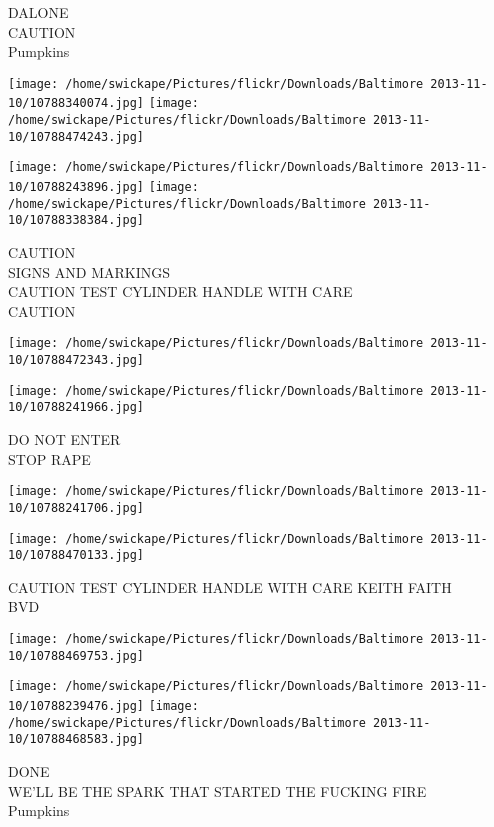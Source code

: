 \documentclass[10pt,letterpaper]{article}
\begin{document}
DALONE\\
CAUTION\\
Pumpkins\\
\pagebreak

\texttt{[image: /home/swickape/Pictures/flickr/Downloads/Baltimore 2013-11-10/10788340074.jpg]}
\texttt{[image: /home/swickape/Pictures/flickr/Downloads/Baltimore 2013-11-10/10788474243.jpg]}

\texttt{[image: /home/swickape/Pictures/flickr/Downloads/Baltimore 2013-11-10/10788243896.jpg]}
\texttt{[image: /home/swickape/Pictures/flickr/Downloads/Baltimore 2013-11-10/10788338384.jpg]}

CAUTION\\
SIGNS AND MARKINGS\\
CAUTION TEST CYLINDER HANDLE WITH CARE\\
CAUTION\\
\pagebreak

\texttt{[image: /home/swickape/Pictures/flickr/Downloads/Baltimore 2013-11-10/10788472343.jpg]}

\vspace{0.25in}
\texttt{[image: /home/swickape/Pictures/flickr/Downloads/Baltimore 2013-11-10/10788241966.jpg]}

DO NOT ENTER\\
STOP RAPE\\
\pagebreak

\texttt{[image: /home/swickape/Pictures/flickr/Downloads/Baltimore 2013-11-10/10788241706.jpg]}

\vspace{0.25in}
\texttt{[image: /home/swickape/Pictures/flickr/Downloads/Baltimore 2013-11-10/10788470133.jpg]}

CAUTION TEST CYLINDER HANDLE WITH CARE KEITH FAITH\\
BVD\\
\pagebreak

\texttt{[image: /home/swickape/Pictures/flickr/Downloads/Baltimore 2013-11-10/10788469753.jpg]}

\vspace{0.25in}
\texttt{[image: /home/swickape/Pictures/flickr/Downloads/Baltimore 2013-11-10/10788239476.jpg]}
\texttt{[image: /home/swickape/Pictures/flickr/Downloads/Baltimore 2013-11-10/10788468583.jpg]}

DONE\\
WE'LL BE THE SPARK THAT STARTED THE FUCKING FIRE\\
Pumpkins\\
\pagebreak
\end{document}
